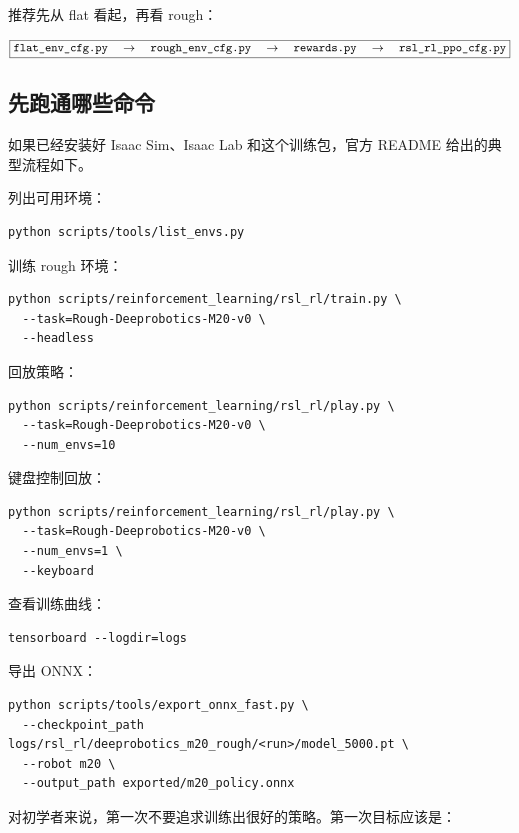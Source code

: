 \documentclass[UTF8,11pt,a4paper]{ctexart}
\begin{document}
推荐先从 flat 看起，再看 rough：

\[
\boxed{
\text{\texttt{flat\_env\_cfg.py}}
\quad\rightarrow\quad
\text{\texttt{rough\_env\_cfg.py}}
\quad\rightarrow\quad
\text{\texttt{rewards.py}}
\quad\rightarrow\quad
\text{\texttt{rsl\_rl\_ppo\_cfg.py}}
}
\]

\subsection{先跑通哪些命令}

如果已经安装好 Isaac Sim、Isaac Lab 和这个训练包，官方 README 给出的典型流程如下。

列出可用环境：

\begin{verbatim}
python scripts/tools/list_envs.py
\end{verbatim}

训练 rough 环境：

\begin{verbatim}
python scripts/reinforcement_learning/rsl_rl/train.py \
  --task=Rough-Deeprobotics-M20-v0 \
  --headless
\end{verbatim}

回放策略：

\begin{verbatim}
python scripts/reinforcement_learning/rsl_rl/play.py \
  --task=Rough-Deeprobotics-M20-v0 \
  --num_envs=10
\end{verbatim}

键盘控制回放：

\begin{verbatim}
python scripts/reinforcement_learning/rsl_rl/play.py \
  --task=Rough-Deeprobotics-M20-v0 \
  --num_envs=1 \
  --keyboard
\end{verbatim}

查看训练曲线：

\begin{verbatim}
tensorboard --logdir=logs
\end{verbatim}

导出 ONNX：

\begin{verbatim}
python scripts/tools/export_onnx_fast.py \
  --checkpoint_path logs/rsl_rl/deeprobotics_m20_rough/<run>/model_5000.pt \
  --robot m20 \
  --output_path exported/m20_policy.onnx
\end{verbatim}

对初学者来说，第一次不要追求训练出很好的策略。第一次目标应该是：
\end{document}
